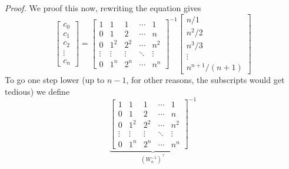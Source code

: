 \documentclass{book}
\begin{document}
\vspace{2em}
\textit{Proof.} We proof this now, rewriting the equation gives
\begin{equation}
    \begin{bmatrix}
        c_0 \\
        c_1 \\
        c_2 \\
        \vdots \\
        c_n
    \end{bmatrix}
    =
    \begin{bmatrix}
        1&1&1&\cdots&1 \\
        0&1&2&\cdots&n \\
        0&1^2&2^2&\cdots&n^2 \\
        \vdots&\vdots & \vdots & \ddots & \vdots\\
        0&1^n&2^n&\cdots&n^n
    \end{bmatrix}^{-1}
    \begin{bmatrix}
        n/1\\
        n^2/2\\
        n^3/3\\
        \vdots \\
        n^{n+1}/(n+1)
    \end{bmatrix} \nonumber
\end{equation}
To go one step lower (up to $n-1$, for other reasons, the subscripts would get tedious) we define
\begin{equation}
    \underbrace{\begin{bmatrix}
        1&1&1&\cdots&1 \\
        0&1&2&\cdots&n \\
        0&1^2&2^2&\cdots&n^2 \\
        \vdots&\vdots & \vdots & \ddots & \vdots\\
        0&1^n&2^n&\cdots&n^n
    \end{bmatrix}^{-1}}_{(W_n^{-1})^\top} \nonumber
\end{equation}
\end{document}
